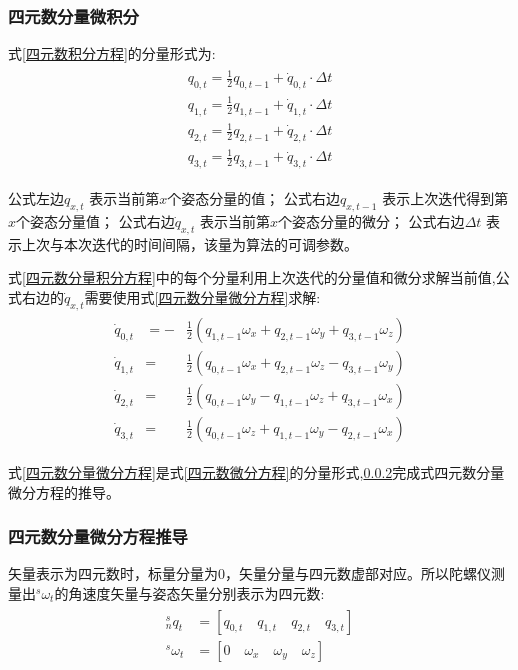 \documentclass[12pt,a4paper]{article}
\begin{document}
\subsubsection{四元数分量微积分}
式\ref{四元数积分方程}的分量形式为:
\begin{eqnarray}\label{四元数分量积分方程}
    \begin{split}
        q_{0,t} = \frac{1}{2}q_{0,t-1} + \dot{q}_{0,t} \cdot \Delta t \\ 
        q_{1,t} = \frac{1}{2}q_{1,t-1} + \dot{q}_{1,t} \cdot \Delta t \\
        q_{2,t} = \frac{1}{2}q_{2,t-1} + \dot{q}_{2,t} \cdot \Delta t \\
        q_{3,t} = \frac{1}{2}q_{3,t-1} + \dot{q}_{3,t} \cdot \Delta t
    \end{split}
\end{eqnarray} 

公式左边$q_{x,t}$       表示当前第$x$个姿态分量的值；
公式右边$q_{x,t-1}$     表示上次迭代得到第$x$个姿态分量值；
公式右边$\dot{q}_{x,t}$ 表示当前第$x$个姿态分量的微分；
公式右边$\Delta t$      表示上次与本次迭代的时间间隔，该量为算法的可调参数。

式\ref{四元数分量积分方程}中的每个分量利用上次迭代的分量值和微分求解当前值,公式右边的$\dot{q}_{x,t}$需要使用式\ref{四元数分量微分方程}求解:
\begin{eqnarray}\label{四元数分量微分方程}
    \begin{split}
        \dot{q}_{0,t}&=- &\frac{1}{2}(q_{1,t-1}\omega_x+q_{2,t-1}\omega_y+q_{3,t-1}\omega_z) \\
        \dot{q}_{1,t}&=  &\frac{1}{2}(q_{0,t-1}\omega_x+q_{2,t-1}\omega_z-q_{3,t-1}\omega_y) \\
        \dot{q}_{2,t}&=  &\frac{1}{2}(q_{0,t-1}\omega_y-q_{1,t-1}\omega_z+q_{3,t-1}\omega_x) \\
        \dot{q}_{3,t}&=  &\frac{1}{2}(q_{0,t-1}\omega_z+q_{1,t-1}\omega_y-q_{2,t-1}\omega_x)
    \end{split}
\end{eqnarray} 

式\ref{四元数分量微分方程}是式\ref{四元数微分方程}的分量形式,\ref{section:四元数分量微分方程推导}完成式四元数分量微分方程的推导。
\subsubsection{四元数分量微分方程推导}\label{section:四元数分量微分方程推导}
矢量表示为四元数时，标量分量为0，矢量分量与四元数虚部对应。所以陀螺仪测量出$^s\omega_t$的角速度矢量与姿态矢量分别表示为四元数:
\begin{eqnarray}\label{四元数分量方程}
    \begin{split}
        ^s_nq_t    &=[q_{0,t}\quad q_{1,t}\quad q_{2,t}\quad q_{3,t}] \\
        ^s\omega_t &=[0\quad \omega_x\quad \omega_y\quad \omega_z]
    \end{split}
\end{eqnarray} 
\end{document}
